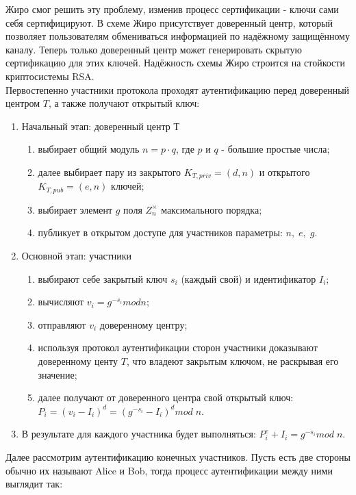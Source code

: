 \documentclass[a4paper]{article}
\begin{document}
Жиро смог решить эту проблему, изменив процесс сертификации - ключи сами себя сертифицируют. В схеме Жиро присутствует доверенный центр,  который позволяет пользователям обмениваться информацией 
по надёжному защищённому каналу. Теперь только доверенный центр может генерировать скрытую сертификацию для этих ключей. 
Надёжность схемы Жиро строится на стойкости криптосистемы RSA.
\\
Первостепенно участники протокола проходят аутентификацию перед доверенный центром $T$, а также получают открытый ключ:
\begin{enumerate}
    \item Начальный этап: доверенный центр Т 
    \begin{enumerate}
        \item выбирает общий модуль $n = p \cdot q$, где $p$ и $q$ - большие простые числа;
        \item далее выбирает пару из закрытого $K_{T, priv} = (d,n)$ и открытого $K_{T, pub}=(e,n)$ ключей; 
        \item выбирает элемент $g$ поля $Z_n^\times$ максимального порядка;
        \item публикует в открытом доступе для участников параметры: $n, \; e, \; g$.
    \end{enumerate}
    \item Основной этап: участники 
    \begin{enumerate}
        \item выбирают себе закрытый ключ $s_i$ (каждый свой) и идентификатор $I_i$;
        \item вычисляют $v_i = g ^{-s_i} mod n$;
        \item отправляют $v_i$ доверенному центру;
        \item используя протокол аутентификации сторон участники доказывают доверенному центу $T$, что владеют закрытым ключом, не раскрывая его значение;
        \item далее получают от доверенного центра свой открытый ключ: $P_i = (v_i - I_i)^d = (g^{-s_i} -I_i)^d mod \; n$.
    \end{enumerate}
    \item В результате для каждого участника будет выполняться: $P_i^e+I_i = g^{-s_i} mod \; n$.
\end{enumerate}
Далее рассмотрим аутентификацию конечных участников. Пусть есть две стороны обычно их называют Alice и Bob, тогда процесс аутентификации между ними выглядит так:
\end{document}
